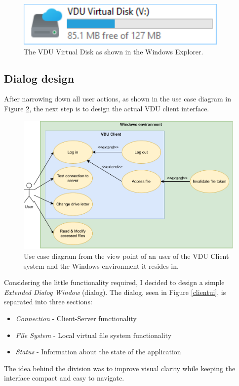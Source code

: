 \begin{figure}[H]
    \centering
    \includegraphics[]{obrazky-figures/explorervdudisk.pdf}
	\caption{The VDU Virtual Disk as shown in the Windows Explorer.}
	\label{explorervdudisk}
\end{figure}

\subsection{Dialog design}
\label{dialogdesign}
After narrowing down all user actions, as shown in the use case diagram in Figure \ref{usecasediagr}, the next step is to design the actual VDU client interface.

\begin{figure}[H]
    \centering
    \includegraphics[width=\columnwidth]{obrazky-figures/usecasediagr.pdf}
	\caption{Use case diagram from the view point of an user of the VDU Client system and the Windows environment it resides in.}
	\label{usecasediagr}
\end{figure}

 Considering the little functionality required, I decided to design a simple \textit{Extended Dialog Window} (dialog). The dialog, seen in Figure \ref{clientui}, is separated into three sections:
 \begin{itemize}
     \item \textit{Connection} - Client-Server functionality
     \item \textit{File System} - Local virtual file system functionality
     \item \textit{Status} - Information about the state of the application
 \end{itemize}
The idea behind the division was to improve visual clarity while keeping the interface compact and easy to navigate.

